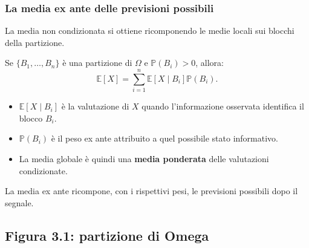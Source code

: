\documentclass[handout]{beamer}%
\newenvironment{stepitemize}{\begin{itemize}[<+->]}{\end{itemize} }
\providecommand{\E}{\mathbb{E}}
\providecommand{\Prob}{\mathbb{P}}
\providecommand{\1}{\mathbf{1}}
\providecommand{\QTR}[2]{\csname #1\endcsname{#2}}
\begin{document}
\begin{frame}%
%

\frametitle{La media ex ante delle previsioni possibili}%
%

%


La media non condizionata si ottiene ricomponendo le medie locali sui blocchi
della partizione.

\medskip

Se $\{B_{1},\ldots,B_{n}\}$ \`{e} una partizione di $\Omega$ e $\Prob(B_{i}%
)>0$, allora:
\[
\E[X] = \sum_{i=1}^{n}\E[X\mid B_i]\Prob(B_{i}).
\]


\medskip

\begin{stepitemize}
\item $\E[X\mid B_i]$ \`{e} la valutazione di $X$ quando l'informazione
osservata identifica il blocco $B_{i}$.

\item $\Prob(B_{i})$ \`{e} il peso ex ante attribuito a quel possibile stato informativo.

\item La media globale \`{e} quindi una \textbf{media ponderata} delle
valutazioni condizionate.
\end{stepitemize}

\medskip

\begin{center}
{\small \textcolor{light-blue}{La media ex ante ricompone, con i
rispettivi pesi, le previsioni possibili dopo il segnale.}}
\end{center}%

\transboxout
\end{frame}%


\subsection{Figura 3.1: partizione di Omega}%
\end{document}
